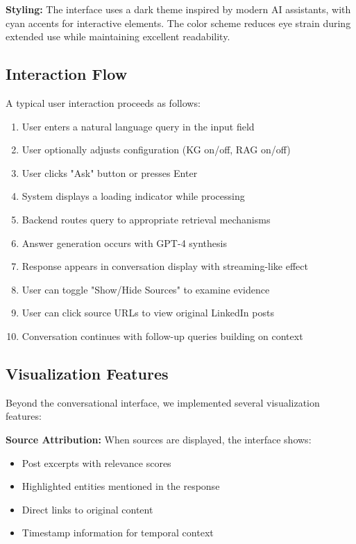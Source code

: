 \documentclass[11pt,twocolumn]{article}
\begin{document}
\textbf{Styling:} The interface uses a dark theme inspired by modern AI assistants, with cyan accents for interactive elements. The color scheme reduces eye strain during extended use while maintaining excellent readability.

\subsection{Interaction Flow}

A typical user interaction proceeds as follows:

\begin{enumerate}
\item User enters a natural language query in the input field
\item User optionally adjusts configuration (KG on/off, RAG on/off)
\item User clicks "Ask" button or presses Enter
\item System displays a loading indicator while processing
\item Backend routes query to appropriate retrieval mechanisms
\item Answer generation occurs with GPT-4 synthesis
\item Response appears in conversation display with streaming-like effect
\item User can toggle "Show/Hide Sources" to examine evidence
\item User can click source URLs to view original LinkedIn posts
\item Conversation continues with follow-up queries building on context
\end{enumerate}

\subsection{Visualization Features}

Beyond the conversational interface, we implemented several visualization features:

\textbf{Source Attribution:} When sources are displayed, the interface shows:
\begin{itemize}
\item Post excerpts with relevance scores
\item Highlighted entities mentioned in the response
\item Direct links to original content
\item Timestamp information for temporal context
\end{itemize}
\end{document}
